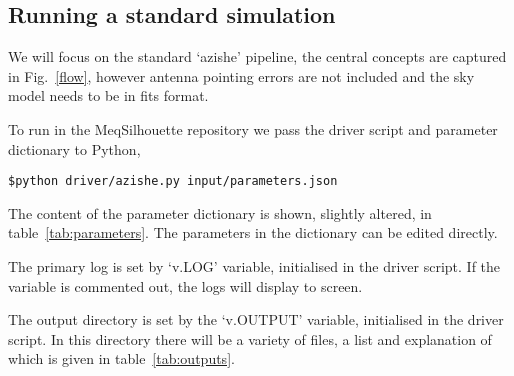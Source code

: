 \subsection{Running a standard simulation}

We will focus on the standard `azishe' pipeline, the central concepts are captured in Fig.~\ref{flow}, however antenna pointing errors are not included and the sky model needs to be in {\sc fits} format. 

To run in the MeqSilhouette repository we pass the driver script and parameter dictionary to {\sc Python},
\begin{verbatim}
$python driver/azishe.py input/parameters.json
\end{verbatim}


The content of the parameter dictionary is shown, slightly altered, in table~\ref{tab:parameters}. The parameters in the dictionary can be edited directly. 

The primary log is set by `v.LOG' variable, initialised in the driver script. If the variable is commented out, the logs will display to screen. 

The output directory is set by the `v.OUTPUT' variable, initialised in the driver script. In this directory there will be a variety of files, a list and explanation of which is given in table~\ref{tab:outputs}.

